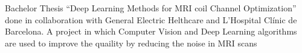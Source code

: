 \begin{tcolorbox}
\begin{minipage}[t]{0.7\textwidth}
\begin{tcolorbox}[grow to right by=0.75cm,height=0.8\textheight,colframe=white,colback=white]
{                Bachelor Thesis ``Deep Learning Methods for MRI coil Channel Optimization'' done in collaboration with 
                General Electric Helthcare and L'Hospital Clínic de Barcelona.
                A project in which Computer Vision and Deep Learning algorithms are used
                to improve the quaility by reducing the noise in MRI scans\\
            }
        \end{tcolorbox}
    \end{minipage}
\end{tcolorbox}



